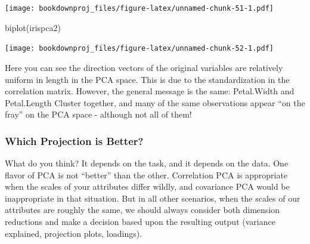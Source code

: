 \documentclass[
]{article}
\newenvironment{Shaded}{\begin{snugshade}}{\end{snugshade}}
\newcommand{\AttributeTok}[1]{\textcolor[rgb]{0.77,0.63,0.00}{#1}}
\newcommand{\DecValTok}[1]{\textcolor[rgb]{0.00,0.00,0.81}{#1}}
\newcommand{\FunctionTok}[1]{\textcolor[rgb]{0.00,0.00,0.00}{#1}}
\newcommand{\NormalTok}[1]{#1}
\newcommand{\SpecialCharTok}[1]{\textcolor[rgb]{0.00,0.00,0.00}{#1}}
\newcommand{\StringTok}[1]{\textcolor[rgb]{0.31,0.60,0.02}{#1}}
\theoremstyle{definition}
\theoremstyle{definition}
\theoremstyle{definition}
\theoremstyle{definition}
\theoremstyle{remark}
\begin{document}
\begin{Shaded}
\end{Shaded}

\texttt{[image: bookdownproj\_files/figure-latex/unnamed-chunk-51-1.pdf]}

\begin{Shaded}
\begin{Highlighting}[]
\FunctionTok{biplot}\NormalTok{(irispca2)}
\end{Highlighting}
\end{Shaded}

\texttt{[image: bookdownproj\_files/figure-latex/unnamed-chunk-52-1.pdf]}

Here you can see the direction vectors of the original variables are relatively uniform in length in the PCA space. This is due to the standardization in the correlation matrix. However, the general message is the same: Petal.Width and Petal.Length Cluster together, and many of the same observations appear ``on the fray'' on the PCA space - although not all of them!

\hypertarget{which-projection-is-better}{%
\subsubsection{Which Projection is Better?}\label{which-projection-is-better}}

What do you think? It depends on the task, and it depends on the data. One flavor of PCA is not ``better'' than the other. Correlation PCA is appropriate when the scales of your attributes differ wildly, and covariance PCA would be inappropriate in that situation. But in all other scenarios, when the scales of our attributes are roughly the same, we should always consider both dimension reductions and make a decision based upon the resulting output (variance explained, projection plots, loadings).
\end{document}
